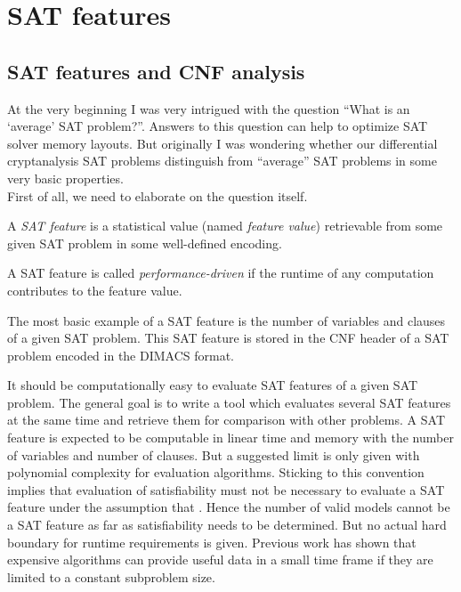 \chapter{SAT features}
\label{ch:sat-features}


\section{SAT features and CNF analysis}
\label{sec:sat-features}
%
At the very beginning I was very intrigued with the question
\enquote{What is an \enquote{average} SAT problem?}. Answers to this
question can help to optimize SAT solver memory layouts.
But originally I was wondering whether our differential cryptanalysis
SAT problems distinguish from \enquote{average} SAT problems in some
very basic properties. \\
First of all, we need to elaborate on the question itself.

\begin{defi}
  A \emph{SAT feature} is a statistical value (named \emph{feature value})
  retrievable from some given SAT problem in some well-defined encoding.

  A SAT feature is called \emph{performance-driven} if the runtime of any
  computation contributes to the feature value.
\end{defi}

The most basic example of a SAT feature is the number of variables and clauses
of a given SAT problem. This SAT feature is stored in the CNF header of a SAT
problem encoded in the DIMACS format.

It should be computationally easy to evaluate SAT features of a given SAT problem.
The general goal is to write a tool which evaluates several SAT features at the same
time and retrieve them for comparison with other problems. A SAT feature
is expected to be computable in linear time and memory with the number of variables
and number of clauses. But a suggested limit is only given with polynomial complexity
for evaluation algorithms. Sticking to this convention implies that evaluation
of satisfiability must not be necessary to evaluate a SAT feature under the
assumption that \cPneqNP. Hence the number of valid models cannot be a SAT feature
as far as satisfiability needs to be determined. But no actual hard boundary for
runtime requirements is given. Previous work has shown that expensive algorithms
can provide useful data in a small time frame if they are limited to a constant
subproblem size.

